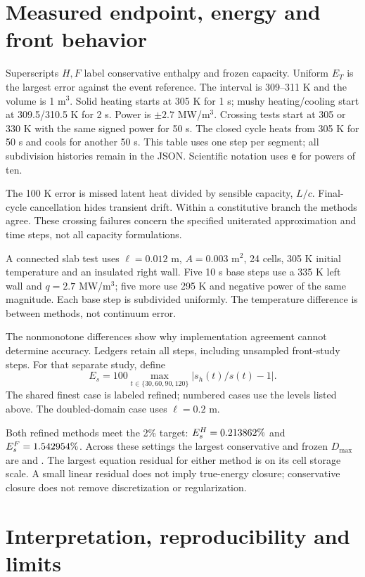 \documentclass[10pt,a4paper]{article}
\begin{document}
\newpage
\section{Measured endpoint, energy and front behavior}
Superscripts $H,F$ label conservative enthalpy and frozen capacity.
Uniform $E_T$ is the largest error against the event reference. The interval
is 309--311 K and the volume is 1 m$^3$. Solid heating starts at 305 K for
1 s; mushy heating/cooling start at 309.5/310.5 K for 2 s. Power is
$\pm2.7$ MW/m$^3$. Crossing tests start at 305 or 330 K with the same signed
power for 50 s. The closed cycle heats from 305 K for 50 s and cools for
another 50 s. This table
uses one step per segment; all subdivision histories remain in the JSON.
Scientific notation uses \texttt{e} for powers of ten.

The 100 K error is missed latent heat divided by sensible capacity, $L/c$.
Final-cycle cancellation hides transient drift. Within a constitutive branch
the methods agree. These crossing failures concern the specified uniterated
approximation and time steps, not all capacity formulations.

A connected slab test uses $\ell=0.012$ m, $A=0.003$ m$^2$, 24 cells,
305 K initial temperature and an insulated right wall. Five 10 s base steps
use a 335 K left wall and $q=2.7$ MW/m$^3$; five more use 295 K and negative
power of the same magnitude. Each base step is subdivided uniformly.
The temperature difference is between methods, not continuum error.

The nonmonotone differences show why implementation agreement cannot determine
accuracy. Ledgers retain all steps, including unsampled front-study steps.
For that separate study, define
\[
E_s=100\max_{t\in\{30,60,90,120\}}|s_h(t)/s(t)-1|.
\]
The shared finest case is labeled refined; numbered cases use the levels
listed above. The doubled-domain case uses $\ell=0.2$ m.

Both refined methods meet the 2\% target: $E_s^H=0.213862\%$ and
$E_s^F=1.542954\%$. Across these settings the largest conservative and
frozen $D_{\max}$ are \texttt{\ConservativeEnergy} and \texttt{\FrozenEnergy}.
The largest equation residual for either method is \texttt{\MaxResidual}
on its cell storage scale. A small linear residual does not imply true-energy
closure; conservative closure does not remove discretization or regularization.

\newpage
\section{Interpretation, reproducibility and limits}
\end{document}
